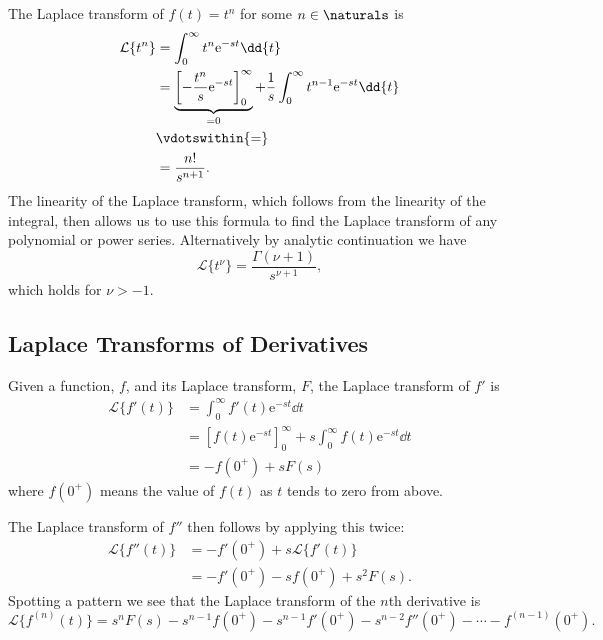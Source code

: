 \documentclass[fleqn]{NotesClass}
\newcommand*{\e}{\mathrm{e}}
\newcommand*{\laplaceTransform}{\mathcal{L}}
\begin{document}
    The Laplace transform of \(f(t) = t^n\) for some \(n \in \naturals\) is
    \begin{align}
        \laplaceTransform\{ t^n \} &= \int_{0}^{\infty} t^n \e^{-st} \dd{t}\\
        &= \underbrace{\left[ -\frac{t^n}{s}\e^{-st} \right]_{0}^{\infty}}_{=0} + \frac{1}{s} \int_{0}^{\infty} t^{n-1} \e^{-st} \dd{t}\\
        &\vdotswithin{=}\\
        &= \frac{n!}{s^{n+1}}.
    \end{align}
    The linearity of the Laplace transform, which follows from the linearity of the integral, then allows us to use this formula to find the Laplace transform of any polynomial or power series.
    Alternatively by analytic continuation we have
    \begin{equation}
        \laplaceTransform\{t^{\nu}\} = \frac{\Gamma(\nu + 1)}{s^{\nu + 1}},
    \end{equation}
    which holds for \(\nu > -1\).
    
    \subsection{Laplace Transforms of Derivatives}
    Given a function, \(f\), and its Laplace transform, \(F\), the Laplace transform of \(f'\) is
    \begin{align}
        \laplaceTransform\{ f'(t) \} &= \int_{0}^{\infty} f'(t) \e^{-st} \dd{t}\\
        &= [f(t) \e^{-st}]_{0}^{\infty} + s\int_{0}^{\infty} f(t) \e^{-st} \dd{t}\\
        &= -f(0^+) + sF(s)
    \end{align}
    where \(f(0^+)\) means the value of \(f(t)\) as \(t\) tends to zero from above.
    
    The Laplace transform of \(f''\) then follows by applying this twice:
    \begin{align}
        \laplaceTransform\{ f''(t) \} &= -f'(0^+) + s\laplaceTransform\{ f'(t) \}\\
        &= -f'(0^+) - sf(0^+) + s^2F(s).
    \end{align}
    Spotting a pattern we see that the Laplace transform of the \(n\)th derivative is
    \begin{equation}
        \laplaceTransform\{ f^{(n)}(t) \} = s^nF(s) - s^{n-1}f(0^+) - s^{n-1}f'(0^+) - s^{n-2}f''(0^+) - \dotsb - f^{(n-1)}(0^+).
    \end{equation}
    
\end{document}
